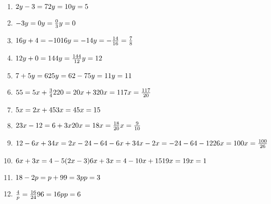  \begin{solutions}{}{
\begin{enumerate}[itemsep=5pt, label=\textbf{\arabic*}. ] 


\begin{enumerate}[itemsep=6pt, label=\textbf{\arabic*}. ] 
\item   $2y-3=7\\2y=10\\y=5$
\item   $-3y=0\\y=\frac{0}{3}\\y=0$        
\item   $16y+4=-10\\16y=-14\\y=-\frac{14}{16}\\=\frac{7}{8}$        
\item   $12y+0=144\\y=\frac{144}{12}\\y=12$
\item   $7+5y=62\\5y=62-7\\5y=11\\y=11$       
\item  $55=5x+\frac{3}{4}\\220=20x+3\\20x=117\\x=\frac{117}{20}$ 
\item   $5x=2x+45\\3x=45\\x=15$        
\item  $23x-12=6+3x\\20x=18\\x=\frac{18}{20}\\x=\frac{9}{10}$
\item   $12-6x+34x=2x-24-64\\-6x+34x-2x=-24-64-12\\ 26x=100\\x=\frac{100}{26}$
\item   $6x+3x=4-5(2x-3)\\6x+3x=4-10x+15\\19x=19\\x=1$
\item   $18-2p=p+9\\9=3p\\p=3$   
\item   $\frac{4}{p}=\frac{16}{24}\\96=16p\\p=6$

\end{enumerate}
\end{enumerate}}
\end{solutions}

